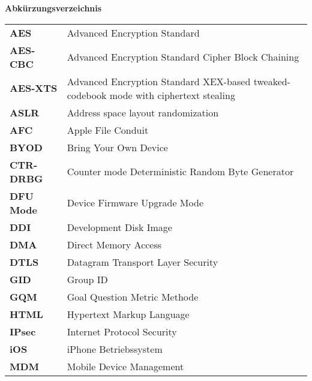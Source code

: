 %
%
% 
% 
% 

\begin{center}
{\Large\bfseries Abkürzungsverzeichnis}
\end{center}

\begin{table*}[htbp]
		 \begin{tabular}{p{3cm}p{12cm}} 
		    \textbf{AES} & Advanced Encryption Standard \\
            \textbf{AES-CBC} & Advanced Encryption Standard Cipher Block Chaining \\
            \textbf{AES-XTS} & Advanced Encryption Standard XEX-based tweaked-codebook mode with ciphertext stealing \\ 
		     \textbf{ASLR} & Address space layout randomization \\
		     \textbf{AFC} & Apple File Conduit\\
		     
		     \textbf{BYOD} & Bring Your Own Device\\
		     
		     \textbf{CTR-DRBG} & Counter mode Deterministic Random Byte Generator \\
		     
		     \textbf{DFU Mode} & Device Firmware Upgrade Mode\\
		     \textbf{DDI} & Development Disk Image \\
		     \textbf{DMA} & Direct Memory Access\\
		     \textbf{DTLS} & Datagram Transport Layer Security \\
		     
		     \textbf{GID} & Group ID \\
		     \textbf{GQM} & Goal Question Metric Methode \\
		     
		     \textbf{HTML} & Hypertext Markup Language \\
		     
		     \textbf{IPsec} & Internet Protocol Security \\
		     \textbf{iOS} & iPhone Betriebssystem\\
		     
		     
		     \textbf{MDM} & Mobile Device Management \\
		     

\end{tabular}
\end{table*}

